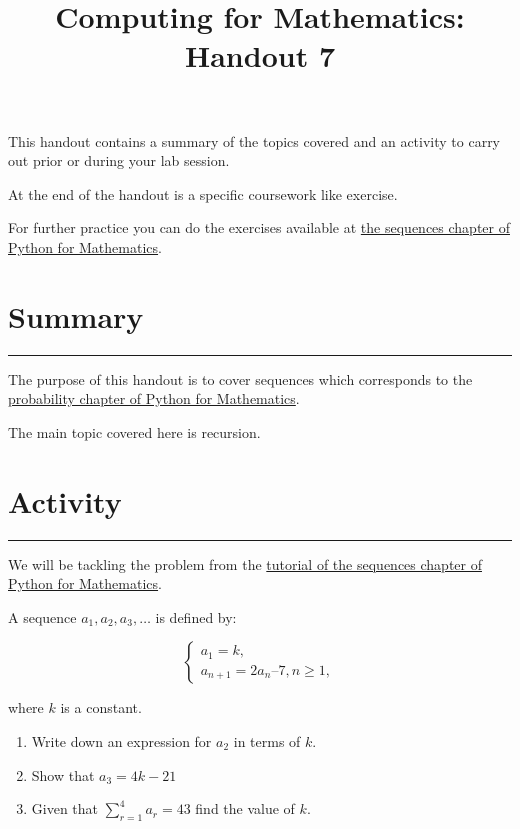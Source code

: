 \documentclass{article}
\title{Computing for Mathematics: Handout 7}
\date{}
\begin{document}
\maketitle


This handout contains a summary of the topics covered and an activity to
carry out prior or during your lab session.

At the end of the handout is a specific coursework like exercise.

For further practice you can do the exercises available at 
\href{https://vknight.org/pfm/tools-for-mathematics/07-sequences/introduction/main.html}{the
sequences chapter of Python for Mathematics}.

\section{Summary}\label{summary}
\hrule


The purpose of this handout is to cover sequences which
corresponds to the
\href{https://vknight.org/pfm/tools-for-mathematics/07-sequences/introduction/main.html}{probability
chapter of Python for Mathematics}.

The main topic covered here is recursion.

\section{Activity}\label{activity}
\hrule

We will be tackling the problem from the
\href{https://vknight.org/pfm/tools-for-mathematics/07-sequences/tutorial/main.html}{tutorial
of the sequences chapter of Python for Mathematics}.

A sequence $a_1, a_2, a_3, …$ is defined by:

$$
    \left\{
    \begin{array}{l}
        a_1 = k,\\
        a_{n + 1} = 2a_n – 7, n \geq 1,
    \end{array}
    \right.
$$

where $k$ is a constant.


\begin{enumerate}
    \item Write down an expression for $a_2$ in terms of $k$.
    \item Show that $a_3 = 4k -21$
    \item Given that $\sum_{r=1}^4 a_r = 43$ find the value of $k$.
\end{enumerate}
\end{document}
